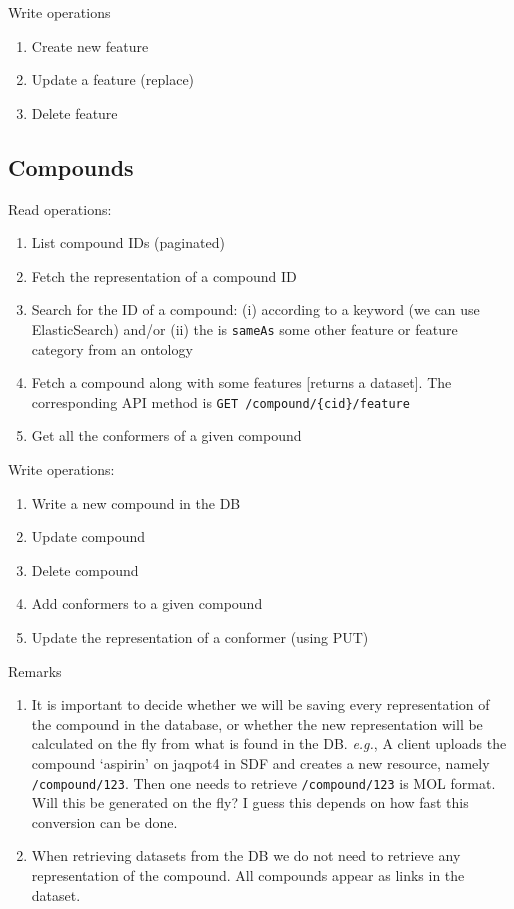 \noindent Write operations
\begin{enumerate}
 \item Create new feature
 \item Update a feature (replace)
 \item Delete feature
\end{enumerate}



\subsection{Compounds}

\noindent Read operations:
\begin{enumerate}
 \item List compound IDs (paginated)
\item  Fetch the representation of a compound ID
\item  Search for the ID of a compound: (i) according to a keyword (we can use ElasticSearch) 
       and/or (ii) the is \texttt{sameAs} some other feature or feature category from an ontology
\item  Fetch a compound along with some features [returns a dataset]. 
   The corresponding API method is \texttt{GET /compound/\{cid\}/feature}
\item  Get all the conformers of a given compound
\end{enumerate}


\noindent Write operations:
\begin{enumerate}
\item Write a new compound in the DB
\item  Update compound
\item  Delete compound
\item  Add conformers to a given compound
\item  Update the representation of a conformer (using PUT)
\end{enumerate}


\noindent Remarks
\begin{enumerate}
\item  It is important to decide whether we will be saving every 
representation of the compound in the database, or whether the new 
representation will be calculated on the fly from what is found in the DB. 
\textit{e.g.}, A client uploads the compound ‘aspirin’ on jaqpot4 in SDF and 
creates a new resource, namely \texttt{/compound/123}. 
Then one needs to retrieve \texttt{/compound/123} is MOL format. 
Will this be generated on the fly? I guess this depends on how fast 
this conversion can be done. 
\item When retrieving datasets from the DB we do not need to 
retrieve any representation of the compound. All compounds appear as links in the dataset.
\end{enumerate}



